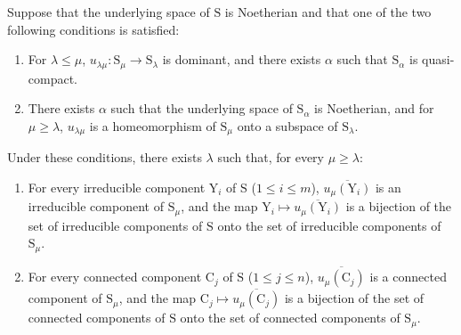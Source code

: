 \begin{proposition}[8.4.2]
\label{IV.8.4.2}
Suppose that the underlying space of $\mathrm{S}$ is Noetherian and that one of the two following conditions is satisfied:
\begin{enumerate}[label=\emph{\alph*)}]
  \item For $\lambda\leqslant\mu$, $u_{\lambda\mu}:\mathrm{S}_\mu\to\mathrm{S}_\lambda$ is dominant, and there exists $\alpha$ such that $\mathrm{S}_\alpha$ is quasi-compact.
  \item There exists $\alpha$ such that the underlying space of $\mathrm{S}_\alpha$ is Noetherian, and for $\mu\geqslant\lambda$, $u_{\lambda\mu}$ is a homeomorphism of $\mathrm{S}_\mu$ onto a subspace of $\mathrm{S}_\lambda$.
\end{enumerate}
Under these conditions, there exists $\lambda$ such that, for every $\mu\geqslant\lambda$:
\begin{enumerate}[label=(\roman*)]
  \item For every irreducible component $\mathrm{Y}_i$ of $\mathrm{S}$ ($1\leqslant i\leqslant m$), $\overline{u_\mu(\mathrm{Y}_i)}$ is an irreducible component of $\mathrm{S}_\mu$, and the map $\mathrm{Y}_i\mapsto\overline{u_\mu(\mathrm{Y}_i)}$ is a bijection of the set of irreducible components of $\mathrm{S}$ onto the set of irreducible components of $\mathrm{S}_\mu$.
  \item For every connected component $\mathrm{C}_j$ of $\mathrm{S}$ ($1\leqslant j\leqslant n$), $\overline{u_\mu(\mathrm{C}_j)}$ is a connected component of $\mathrm{S}_\mu$, and the map $\mathrm{C}_j\mapsto\overline{u_\mu(\mathrm{C}_j)}$ is a bijection of the set of connected components of $\mathrm{S}$ onto the set of connected components of $\mathrm{S}_\mu$.
\end{enumerate}
\end{proposition}

